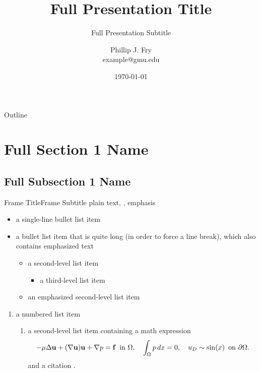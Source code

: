 \documentclass[
  aspectratio=169,
]{beamer}
\title[Short Presentation Title]{Full Presentation Title}
\subtitle[Short Presentation Subtitle]{Full Presentation Subtitle}
\author[P. J. Fry]{Phillip J. Fry\texorpdfstring{\\}{, }example@gmu.edu}
\institute[GMU Astronomy]{Department of Astronomy, George Mason University}
\date{\today}
\begin{document}
\begin{frame}[plain]
\maketitle
\end{frame}

\begin{frame}{Outline}
\tableofcontents
\end{frame}

\section[Short Section 1 Name]{Full Section 1 Name}
\subsection[Short Subsection 1 Name]{Full Subsection 1 Name}

\begin{frame}{Frame Title}{Frame Subtitle}
plain text, , \alert{emphasis}
\begin{itemize}
  \item a single-line bullet list item
  \item a bullet list item that is quite long (in order to force a line break),
    which also contains \alert{emphasized text}
  \begin{itemize}
    \item a second-level list item
    \begin{itemize}
      \item a third-level list item
    \end{itemize}
    \item \alert{an emphasized second-level list item}
  \end{itemize}
\end{itemize}
\begin{enumerate}
  \item a numbered list item
  \begin{enumerate}
    \item a second-level list item containing a math expression
      \[ 
        -\mu \Delta \mathbf{u} + (\nabla \mathbf{u}) \mathbf{u} + \nabla p = \mathbf{f} \enskip \text{in } \Omega, \quad \int_{\Omega} p \, dx = 0, \quad u_D \sim \sin(x) \enskip \text{on }\partial \Omega.
      \]
      and a citation \cite{b0}.
  \end{enumerate}
\end{enumerate}
\end{frame}
\end{document}

